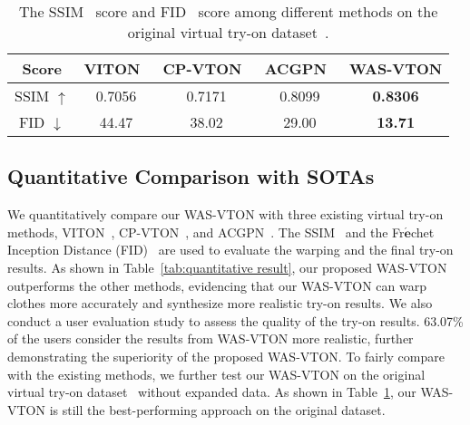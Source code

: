 \documentclass[sigconf]{acmart}
\begin{document}
\begin{table}
    \centering
    \tabcolsep 2pt
    \begin{tabular}{c|ccc|c}
         \toprule
         Score & VITON~\cite{xintong2018viton} & CP-VTON~\cite{bochao2018cpvton} & ACGPN~\cite{han2020acgpn} & WAS-VTON \\
        \midrule
        SSIM $\uparrow$ & 0.7056 &  0.7171 & 0.8099 & \textbf{0.8306}  \\
        FID $\downarrow$ & 44.47 & 38.02 & 29.00 &  \textbf{13.71}  \\
        \bottomrule
    \end{tabular}
     \caption{The SSIM~\cite{2004SSIM} score and FID~\cite{heusel2017fid} score among different methods on the original virtual try-on dataset~\cite{xintong2018viton}. 
      } 
    \label{tab:original_comp}
    \vspace{-8mm}
\end{table}

\subsection{Quantitative Comparison with SOTAs}
We quantitatively compare our WAS-VTON with three existing virtual try-on methods, VITON~\cite{xintong2018viton}, CP-VTON~\cite{bochao2018cpvton}, and ACGPN~\cite{han2020acgpn}. The SSIM~\cite{2004SSIM} and the Fr$\mathbf{\acute{e}}$chet Inception Distance (FID)~\cite{heusel2017fid} are used to evaluate the warping and the final try-on results.
As shown in Table~\ref{tab:quantitative result}, our proposed WAS-VTON outperforms the other methods, evidencing that our WAS-VTON can warp clothes more accurately and synthesize more realistic try-on results. 
We also conduct a user evaluation study
to assess the quality of the try-on results. 63.07\% of the users consider the results from WAS-VTON more realistic, further demonstrating the superiority of the proposed WAS-VTON. 
To fairly compare with the existing methods, we further test our WAS-VTON on the original virtual try-on dataset~\cite{xintong2018viton} without expanded data. As shown in Table~\ref{tab:original_comp}, our WAS-VTON is still the best-performing approach on the original dataset.
\end{document}
